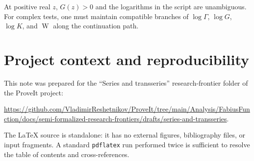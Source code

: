 \documentclass[11pt,oneside]{article}
\theoremstyle{plain}
\theoremstyle{definition}
\theoremstyle{remark}
\newcommand{\W}{\operatorname{W}}
\begin{document}
At positive real \(z\), \(G(z)>0\) and the logarithms in the script are
unambiguous.  For complex tests, one must maintain compatible branches of
\(\log\Gamma\), \(\log G\), \(\log K\), and \(\W\) along the continuation
path.

\section{Project context and reproducibility}
\label{app:project-context}

This note was prepared for the ``Series and transseries'' research-frontier
folder of the ProveIt project:
\begin{center}
\url{https://github.com/VladimirReshetnikov/ProveIt/tree/main/Analysis/FabiusFunction/docs/semi-formalized-research-frontiers/drafts/series-and-transseries}.
\end{center}
The \LaTeX{} source is standalone: it has no external figures, bibliography
files, or input fragments.  A standard \texttt{pdflatex} run performed twice
is sufficient to resolve the table of contents and cross-references.
\end{document}
